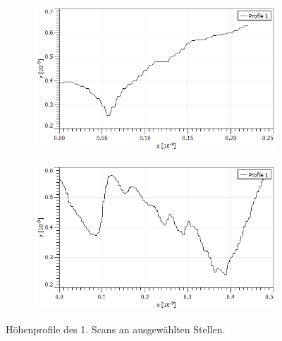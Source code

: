 \begin{figure}[]
      \begin{subfigure}{.475\linewidth}
        \includegraphics[width=\linewidth]{Messdaten/Hoehenprofil_anderes/3.png}
      \end{subfigure}\hfill 
      \begin{subfigure}{.475\linewidth}
        \includegraphics[width=\linewidth]{Messdaten/Hoehenprofil_anderes/4.png}
      \end{subfigure}\hfill 
      \caption{Höhenprofile des 1. Scans an ausgewählten Stellen.}
      \label{fig:Hoehenprofil_Bild_1}
  \end{figure}

